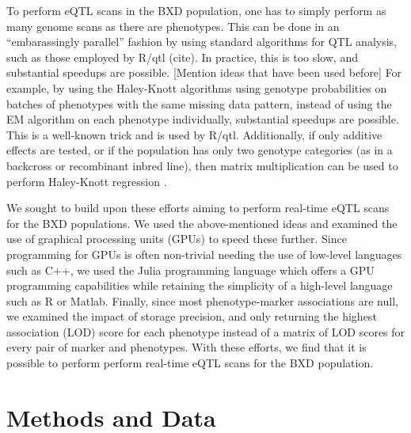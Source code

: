 \documentclass[9pt,twocolumn,twoside,lineno]{gsag3jnl}
\begin{document}
To perform eQTL scans in the BXD population, one has to simply perform
as many genome scans as there are phenotypes.  This can be done in an
``embarassingly parallel'' fashion by using standard algorithms for
QTL analysis, such as those employed by R/qtl (cite).  In practice,
this is too slow, and substantial speedups are possible.  [Mention
  ideas that have been used before] For example, by using the
Haley-Knott algorithms using genotype probabilities on batches of
phenotypes with the same missing data pattern, instead of using the EM
algorithm on each phenotype individually, substantial speedups are
possible.  This is a well-known trick and is used by R/qtl.
Additionally, if only additive effects are tested, or if the
population has only two genotype categories (as in a backcross or
recombinant inbred line), then matrix multiplication can be used to
perform Haley-Knott regression \citep{shabalin2012matrix}.


We sought to build upon these efforts aiming to perform real-time eQTL
scans for the BXD populations.  We used the above-mentioned ideas and
examined the use of graphical processing units (GPUs) to speed these
further.  Since programming for GPUs is often non-trivial needing the
use of low-level languages such as C++, we used the Julia programming
language which offers a GPU programming capabilities while retaining
the simplicity of a high-level language such as R or Matlab.  Finally,
since most phenotype-marker associations are null, we examined the
impact of storage precision, and only returning the highest
association (LOD) score for each phenotype instead of a matrix of LOD
scores for every pair of marker and phenotypes.  With these efforts,
we find that it is possible to perform perform real-time eQTL scans
for the BXD population.

\section{Methods and Data}
\label{sec:methods:Data}

\end{document}
